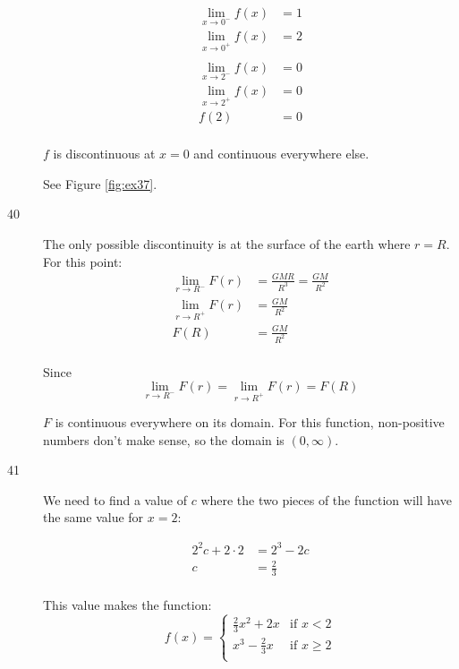 \documentclass[letterpaper]{exam}
\begin{document}
\begin{description}
        \begin{align*}
          \lim_{x \to 0^-} f(x) & = 1 \\
          \lim_{x \to 0^+} f(x) & = 2 \\
          \\
          \lim_{x \to 2^-} f(x) & = 0 \\
          \lim_{x \to 2^+} f(x) & = 0 \\
          f(2)                  & = 0 \\
        \end{align*}

        $f$ is discontinuous at $x = 0$ and continuous everywhere else.

        See Figure \ref{fig:ex37}.

      \item[40]
        The only possible discontinuity is at the surface of the earth where $r = R$. For this point:
        \begin{align*}
          \lim_{r \to R^-} F(r) & = \frac{GMR}{R^3} = \frac{GM}{R^2} \\
          \lim_{r \to R^+} F(r) & = \frac{GM}{R^2} \\
          F(R)                  & = \frac{GM}{R^2} \\
        \end{align*}

        Since
        \[
          \lim_{r \to R^-} F(r) = \lim_{r \to R^+} F(r) = F(R)
        \]

        $F$ is continuous everywhere on its domain. For this function, non-positive
        numbers don't make sense, so the domain is $(0, \infty)$.

      \item[41]
        We need to find a value of $c$ where the two pieces of the function will have the
        same value for $x = 2$:

        \begin{align*}
          2^2 c + 2 \cdot 2 & = 2^3 - 2c \\
          c                 & = \frac{2}{3} \\
        \end{align*}

        This value makes the function:
        \[
          f(x) = 
            \begin{cases}
              \frac{2}{3} x^2 + 2x & \text{if } x < 2 \\
              x^3 - \frac{2}{3} x  & \text{if } x \geq 2 \\
            \end{cases}
        \]


\end{description}
\end{document}
